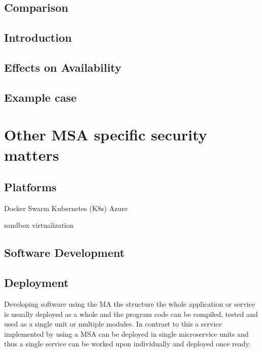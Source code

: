\subsection{Comparison}
\begin{sloppypar}
    
\end{sloppypar}


\subsection{Introduction}
\begin{sloppypar}

\end{sloppypar}

\subsection{Effects on Availability}
\begin{sloppypar}

\end{sloppypar}

\subsection{Example case}
\begin{sloppypar}

\end{sloppypar}




\section{Other MSA specific security matters}
\subsection{Platforms}
\begin{sloppypar}

\end{sloppypar}

Docker Swarm
Kubernetes (K8s)
Azure

sandbox
virtualization 

\subsection{Software Development}
\subsection{Deployment}
\begin{sloppypar}
    Developing software using the MA the structure the whole application or service 
    is usually deployed as a whole and the program code can be compiled, tested 
    and used as a single unit or multiple modules. In contrast to this a service 
    implemented by using a MSA can be deployed in single microservice units and 
    thus a single service can be worked upon individually and deployed once ready.
\end{sloppypar}

